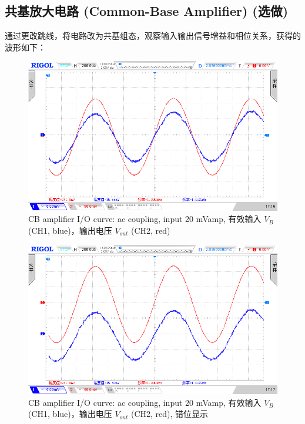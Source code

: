 \documentclass[UTF8]{article}
\begin{document}
\subsection{共基放大电路 (Common-Base Amplifier) (选做)}
通过更改跳线，将电路改为共基组态，观察输入输出信号增益和相位关系，获得的波形如下：
\begin{figure}[H]\centering
    \includegraphics[width=\columnwidth]{LCE-02-三极管/assets/CB 输入输出.png}
    \caption{CB amplifier I/O curve: ac coupling, input 20 mVamp, 有效输入 $V_{B}$ (CH1, blue)，输出电压 $V_{out}$ (CH2, red)}
\end{figure}
\begin{figure}[H]\centering
    \includegraphics[width=\columnwidth]{LCE-02-三极管/assets/CB 输入输出 (错位).png}
    \caption{CB amplifier I/O curve: ac coupling, input 20 mVamp, 有效输入 $V_{B}$ (CH1, blue)，输出电压 $V_{out}$ (CH2, red), 错位显示}
\end{figure}
\end{document}
